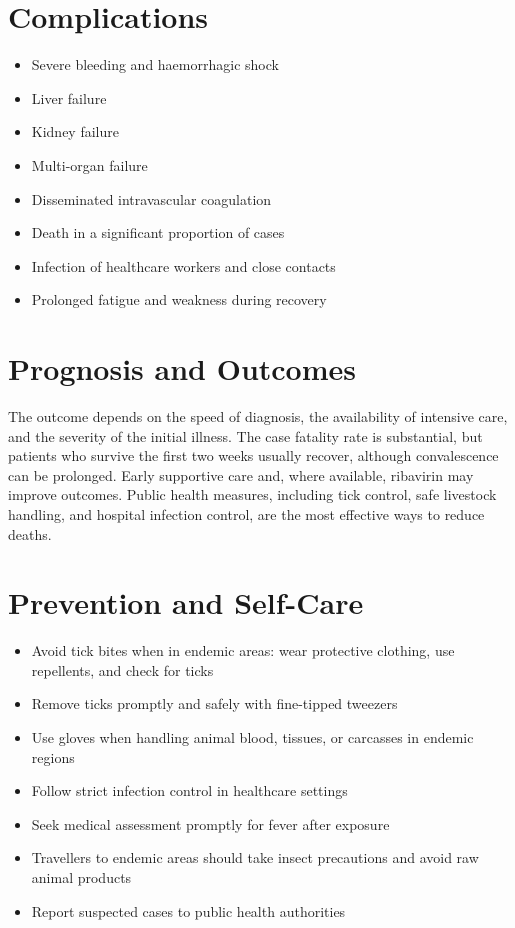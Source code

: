 \section*{Complications}
\begin{itemize}
    \item Severe bleeding and haemorrhagic shock
    \item Liver failure
    \item Kidney failure
    \item Multi-organ failure
    \item Disseminated intravascular coagulation
    \item Death in a significant proportion of cases
    \item Infection of healthcare workers and close contacts
    \item Prolonged fatigue and weakness during recovery
\end{itemize}

\section*{Prognosis and Outcomes}
The outcome depends on the speed of diagnosis, the availability of intensive care, and the severity of the initial illness. The case fatality rate is substantial, but patients who survive the first two weeks usually recover, although convalescence can be prolonged. Early supportive care and, where available, ribavirin may improve outcomes. Public health measures, including tick control, safe livestock handling, and hospital infection control, are the most effective ways to reduce deaths.

\section*{Prevention and Self-Care}
\begin{itemize}
    \item Avoid tick bites when in endemic areas: wear protective clothing, use repellents, and check for ticks
    \item Remove ticks promptly and safely with fine-tipped tweezers
    \item Use gloves when handling animal blood, tissues, or carcasses in endemic regions
    \item Follow strict infection control in healthcare settings
    \item Seek medical assessment promptly for fever after exposure
    \item Travellers to endemic areas should take insect precautions and avoid raw animal products
    \item Report suspected cases to public health authorities
\end{itemize}


